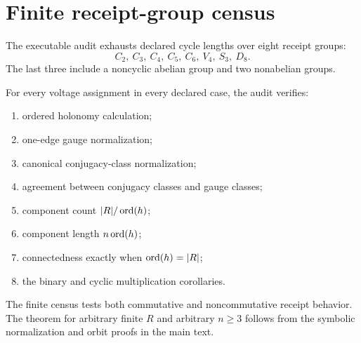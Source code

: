 \section{Finite receipt-group census}

The executable audit exhausts declared cycle lengths over eight receipt
groups:
\[
C_2,\ C_3,\ C_4,\ C_5,\ C_6,\ V_4,\ S_3,\ D_8.
\]
The last three include a noncyclic abelian group and two nonabelian groups.

For every voltage assignment in every declared case, the audit verifies:
\begin{enumerate}
\item ordered holonomy calculation;
\item one-edge gauge normalization;
\item canonical conjugacy-class normalization;
\item agreement between conjugacy classes and gauge classes;
\item component count $|R|/\operatorname{ord}(h)$;
\item component length $n\operatorname{ord}(h)$;
\item connectedness exactly when $\operatorname{ord}(h)=|R|$;
\item the binary and cyclic multiplication corollaries.
\end{enumerate}

The finite census tests both commutative and noncommutative receipt behavior.
The theorem for arbitrary finite $R$ and arbitrary $n\geq3$ follows from the
symbolic normalization and orbit proofs in the main text.

